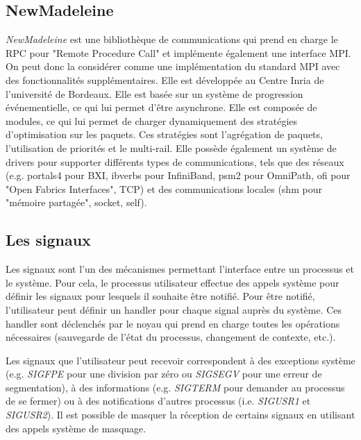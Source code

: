 \subsection{NewMadeleine}

\emph{NewMadeleine} est une bibliothèque de communications qui prend en charge le RPC pour "Remote Procedure Call" et implémente également une interface MPI.
On peut donc la considérer comme une implémentation du standard MPI avec des fonctionnalités supplémentaires.
Elle est développée au Centre Inria de l'université de Bordeaux.
Elle est basée sur un système de progression événementielle, ce qui lui permet d'être asynchrone.
Elle est composée de modules, ce qui lui permet de charger dynamiquement des stratégies d'optimisation sur les paquets.
Ces stratégies sont l'agrégation de paquets, l'utilisation de priorités et le multi-rail. %
Elle possède également un système de drivers pour supporter différents types de communications, tels que des réseaux
(e.g. portals4 pour BXI, ibverbs pour InfiniBand, psm2 pour OmniPath, ofi pour "Open Fabrics Interfaces", TCP) %
et des communications locales (shm pour "mémoire partagée", socket, self).

\subsection{Les signaux}
\label{sec:signal}

Les signaux\cite{linuxSignalMan} sont l'un des mécanismes permettant l'interface entre un processus et le système.
Pour cela, le processus utilisateur effectue des appels système pour définir les signaux pour lesquels il souhaite être notifié.
Pour être notifié, l'utilisateur peut définir un handler pour chaque signal auprès du système.
Ces handler sont déclenchés par le noyau qui prend en charge toutes les opérations nécessaires (sauvegarde de l'état du processus, changement de contexte, etc.).

Les signaux que l'utilisateur peut recevoir correspondent à des exceptions système (e.g. \emph{SIGFPE} pour une division par zéro ou \emph{SIGSEGV} pour une erreur de segmentation),
à des informations (e.g. \emph{SIGTERM} pour demander au processus de se fermer) ou à des notifications d'autres processus (i.e. \emph{SIGUSR1} et \emph{SIGUSR2}).
Il est possible de masquer la réception de certains signaux en utilisant des appels système de masquage.

